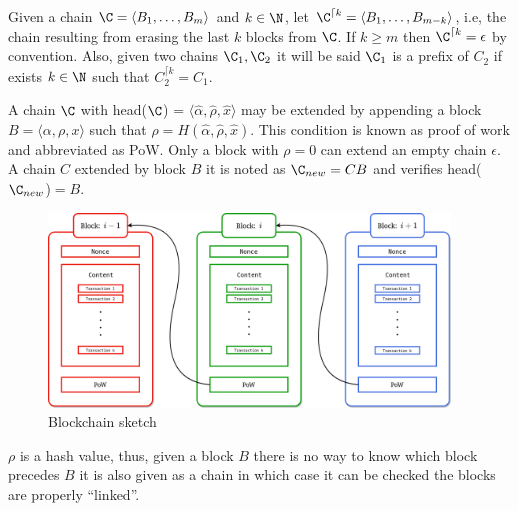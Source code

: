 \documentclass[..]{subfiles}
\begin{document}
Given a chain $\C = \langle B_1, \dots, B_m \rangle$ and $k \in \N$, let $\C^{\lceil k} = \langle B_1, \dots, B_{m-k}\rangle$, i.e, the chain resulting from erasing the last $k$ blocks from $\C$. If $k \ge m$ then $\C^{\lceil k} = \epsilon$ by convention. Also, given two chains $\C_1, \C_2$ it will be said $\C_1$ is a prefix of $C_2$ if exists $k \in \N$ such that $C_2^{\lceil k} = C_1$.

A chain $\C$ with head($\C$) = $\langle \hat\alpha, \hat\rho, \hat x \rangle$ may be extended by appending a block $B = \langle \alpha, \rho, x \rangle$  such that $\rho = H(\hat\alpha, \hat\rho, \hat x)$. This condition is known as proof of work and abbreviated as PoW. Only a block with $\rho = 0$ can extend an empty chain $\epsilon$\footnotemark. A chain $C$ extended by block $B$ it is noted as $\C_{new} = CB$ and verifies head($\C_{new}$)$=B$.

\begin{figure}
	\begin{center}
		\includegraphics[width=0.95\textwidth]{figures/blockchain.png}
	\end{center}
	\caption{Blockchain sketch}
	\label{fig:blockchain}
\end{figure}


\begin{remark}
	\normalfont
	$\rho$ is a hash value, thus, given a block $B$ there is no way to know which block precedes $B$ it is also given as a chain in which case it can be checked the blocks are properly ``linked''.
\end{remark}
\end{document}
